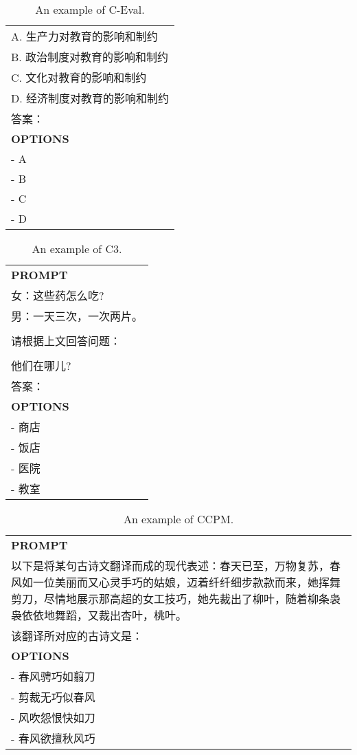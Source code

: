 \begin{table}[ht]
\begin{tabular}{p{12cm}}
\\A. 生产力对教育的影响和制约
\\B. 政治制度对教育的影响和制约
\\C. 文化对教育的影响和制约
\\D. 经济制度对教育的影响和制约
\\答案：\\
\midrule
\textbf{OPTIONS}\\
- A\\
- B\\
- C\\
- D\\
\bottomrule
\end{tabular}
    \caption{\centering An example of C-Eval.}
    \label{tab:ceval_eval_format_example}
\end{table}

\begin{table}[ht]
    \centering \small
\begin{tabular}{p{12cm}}
\toprule
\textbf{PROMPT}\\
女：这些药怎么吃?
\\男：一天三次，一次两片。
\\
\\请根据上文回答问题：
\\
\\他们在哪儿?
\\答案：\\
\midrule
\textbf{OPTIONS}\\
- 商店\\
- 饭店\\
- 医院\\
- 教室\\
\bottomrule
\end{tabular}
    \caption{\centering An example of C3.}
    \label{tab:c3_eval_format_example}
\end{table}

\begin{table}[ht]
    \centering \small
\begin{tabular}{p{12cm}}
\toprule
\textbf{PROMPT}\\
以下是将某句古诗文翻译而成的现代表述：春天已至，万物复苏，春风如一位美丽而又心灵手巧的姑娘，迈着纤纤细步款款而来，她挥舞剪刀，尽情地展示那高超的女工技巧，她先裁出了柳叶，随着柳条袅袅依依地舞蹈，又裁出杏叶，桃叶。
\\该翻译所对应的古诗文是：\\
\midrule
\textbf{OPTIONS}\\
- 春风骋巧如翦刀\\
- 剪裁无巧似春风\\
- 风吹怨恨快如刀\\
- 春风欲擅秋风巧\\
\bottomrule
\end{tabular}
    \caption{\centering An example of CCPM.}
    \label{tab:ccpm_eval_format_example}
\end{table}

